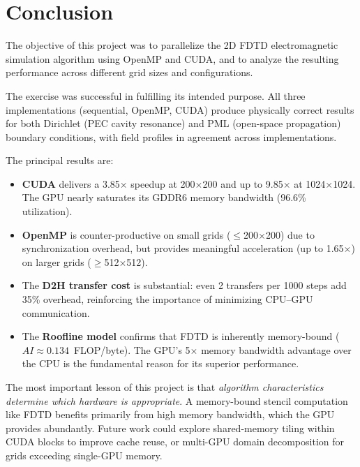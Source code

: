 \documentclass[12pt,a4paper]{article}
\begin{document}
\section{Conclusion}

The objective of this project was to parallelize the 2D FDTD
electromagnetic simulation algorithm using OpenMP and CUDA, and to
analyze the resulting performance across different grid sizes and
configurations.

The exercise was successful in fulfilling its intended purpose.
All three implementations (sequential, OpenMP, CUDA) produce
physically correct results for both Dirichlet (PEC cavity resonance)
and PML (open-space propagation) boundary conditions, with
field profiles in agreement across implementations.

The principal results are:
\begin{itemize}
    \item \textbf{CUDA} delivers a 3.85$\times$ speedup at
          200$\times$200 and up to 9.85$\times$ at 1024$\times$1024.
          The GPU nearly saturates its GDDR6 memory bandwidth
          (96.6\% utilization).
    \item \textbf{OpenMP} is counter-productive on small grids
          ($\leq$200$\times$200) due to synchronization overhead,
          but provides meaningful acceleration (up to 1.65$\times$)
          on larger grids ($\geq$512$\times$512).
    \item The \textbf{D2H transfer cost} is substantial: even 2
          transfers per 1000 steps add 35\% overhead, reinforcing
          the importance of minimizing CPU–GPU communication.
    \item The \textbf{Roofline model} confirms that FDTD is
          inherently memory-bound ($AI \approx 0.134$~FLOP/byte).
          The GPU's 5$\times$ memory bandwidth advantage over the
          CPU is the fundamental reason for its superior performance.
\end{itemize}

The most important lesson of this project is that \emph{algorithm
characteristics determine which hardware is appropriate}.
A memory-bound stencil computation like FDTD benefits primarily
from high memory bandwidth, which the GPU provides abundantly.
Future work could explore shared-memory tiling within CUDA blocks
to improve cache reuse, or multi-GPU domain decomposition for
grids exceeding single-GPU memory.
\end{document}
